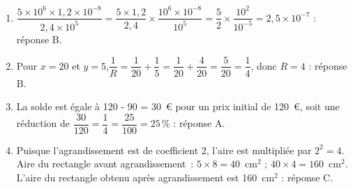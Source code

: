 
\medskip

%
%
%
%
\begin{enumerate}
\item $\dfrac{5 \times 10^6 \times 1,2 \times 10^{- 8} }{2,4 \times  10^5} = \dfrac{5 \times 1,2}{2,4} \times \dfrac{10^6 \times 10^{-8}}{10^5} = \dfrac{5}{2}\times \dfrac{10^2}{10^{-5}} = 2,5 \times 10^{- 7}$ : réponse B.
\item Pour $x = 20$ et $y = 5$,\:$\dfrac{1}{R} = \dfrac{1}{20} + \dfrac{1}{5} =  \dfrac{1}{20} +  \dfrac{4}{20}  =  \dfrac{5}{20}  =  \dfrac{1}{4}$, donc $R = 4$ : réponse B.
\item La solde est égale à 120 - 90 = 30~\euro{} pour un prix initial de 120~\euro, soit une réduction de $\dfrac{30}{120} = \dfrac{1}{4} = \dfrac{25}{100} = 25$\,\% : réponse A.
\item Puisque l'agrandissement est de coefficient 2, l'aire est multipliée par $2^2 = 4$. 
	Aire du rectangle avant agrandissement : $5 \times 8 = 40$~cm$^2$ ; 
	$40 \times  4 = 160$~cm$^2$.	L'aire du rectangle obtenu après agrandissement est 160~cm$^2$ :  réponse C.
\end{enumerate}

\vspace{0,5cm}

